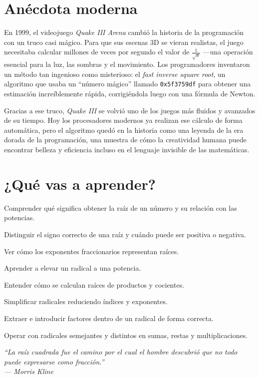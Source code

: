 \section*{Anécdota moderna}

\begin{reseñaplana}
En 1999, el videojuego \textit{Quake III Arena} cambió la historia de la programación con un truco casi mágico. 
Para que sus escenas 3D se vieran realistas, el juego necesitaba calcular millones de veces por segundo el valor 
de $ \frac{1}{\sqrt{x}} $ —una operación esencial para la luz, las sombras y el movimiento. Los programadores 
inventaron un método tan ingenioso como misterioso: el \textit{fast inverse square root}, un algoritmo que usaba 
un ``número mágico'' llamado \texttt{0x5f3759df} para obtener una estimación increíblemente rápida, corrigiéndola 
luego con una fórmula de Newton.  

Gracias a ese truco, \textit{Quake III} se volvió uno de los juegos más fluidos y avanzados de su tiempo. 
Hoy los procesadores modernos ya realizan ese cálculo de forma automática, pero el algoritmo quedó en la historia 
como una leyenda de la era dorada de la programación, una muestra de cómo la creatividad humana puede encontrar belleza
y eficiencia incluso en el lenguaje invisible de las matemáticas.
\end{reseñaplana}

\section*{¿Qué vas a aprender?}
\begin{reseñaitem}
  \item Comprender qué significa obtener la raíz de un número y su relación con las potencias.  
  \item Distinguir el signo correcto de una raíz y cuándo puede ser positiva o negativa.  
  \item Ver cómo los exponentes fraccionarios representan raíces.
  \item Aprender a elevar un radical a una potencia.  
  \item Entender cómo se calculan raíces de productos y cocientes.
  \item Simplificar radicales reduciendo índices y exponentes.  
  \item Extraer e introducir factores dentro de un radical de forma correcta.  
  \item Operar con radicales semejantes y distintos en sumas, restas y multiplicaciones.
\end{reseñaitem}

\vspace{1.5cm} %
\begin{flushright}
  {\fontsize{12}{14}\selectfont\itshape
  ``La raíz cuadrada fue el camino por el cual el hombre descubrió que no todo puede expresarse como fracción.''\\[6pt]
  — Morris Kline}%
\end{flushright}


